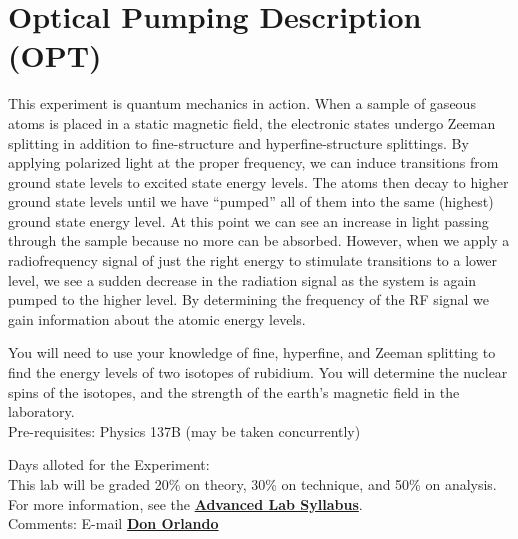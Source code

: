 \documentclass{../lab}
\begin{document}
\maketitle

\tableofcontents

\section{Optical Pumping Description (OPT)}

This experiment is quantum mechanics in action. When a sample of gaseous atoms is placed in a static magnetic field, the electronic states undergo Zeeman splitting in addition to fine-structure and hyperfine-structure splittings. By applying polarized light at the proper frequency, we can induce transitions from ground state levels to excited state energy levels. The atoms then decay to higher ground state levels until we have ``pumped'' all of them into the same (highest) ground state energy level. At this point we can see an increase in light passing through the sample because no more can be absorbed. However, when we apply a radiofrequency signal of just the right energy to stimulate transitions to a lower level, we see a sudden decrease in the radiation signal as the system is again pumped to the higher level. By determining the frequency of the RF signal we gain information about the atomic energy levels.

You will need to use your knowledge of fine, hyperfine, and Zeeman splitting to find the energy levels of two isotopes of rubidium. You will determine the nuclear spins of the isotopes, and the strength of the earth's magnetic field in the laboratory. \\

Pre-requisites: Physics 137B (may be taken concurrently)

Days alloted for the Experiment: \\

This lab will be graded 20\% on theory, 30\% on technique, and 50\% on analysis. For more information, see the \href{\AdvancedLabSyllabus}{\textbf{Advanced Lab Syllabus}}. \\

Comments: E-mail \href{\MailDonOrlando}{\textbf{Don Orlando}}
\end{document}
